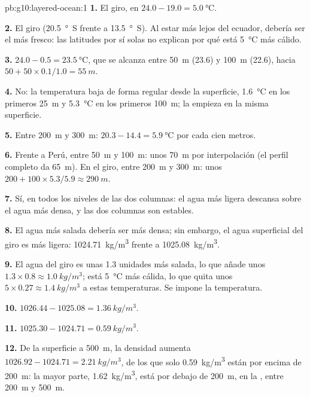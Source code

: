 \begin{solution}{pb:g10:layered-ocean:1}
\textbf{1.} El giro, en $24.0 - 19.0 = \qty{5.0}{\degreeCelsius}$.

\textbf{2.} El giro (\qty{20.5}{\degree S} frente a \qty{13.5}{\degree S}).
Al estar más lejos del ecuador, debería ser el más fresco: las latitudes por
sí solas no explican por qué está \qty{5}{\degreeCelsius} más cálido.

\textbf{3.} $24.0 - 0.5 = \qty{23.5}{\degreeCelsius}$, que se alcanza entre
\qty{50}{m} (23.6) y \qty{100}{m} (22.6), hacia $50 + 50 \times
0.1/1.0 = \qty{55}{m}$.

\textbf{4.} No: la temperatura baja de forma regular desde la superficie,
\qty{1.6}{\degreeCelsius} en los primeros \qty{25}{m} y
\qty{5.3}{\degreeCelsius} en los primeros \qty{100}{m}; la  empieza
en la misma superficie.

\textbf{5.} Entre \qty{200}{m} y \qty{300}{m}: $20.3 - 14.4 =
\qty{5.9}{\degreeCelsius}$ por cada cien metros.

\textbf{6.} Frente a Perú, entre \qty{50}{m} y \qty{100}{m}: unos
\qty{70}{m} por interpolación (el perfil completo da \qty{65}{m}). En el
giro, entre \qty{200}{m} y \qty{300}{m}: unos $200 + 100 \times 5.3/5.9
\approx \qty{290}{m}$.

\textbf{7.} Sí, en todos los niveles de las dos columnas: el agua más ligera
descansa sobre el agua más densa, y las dos columnas son estables.

\textbf{8.} El agua más salada debería ser más densa; sin embargo, el agua
superficial del giro es más ligera: \qty{1024.71}{kg/m^3} frente a
\qty{1025.08}{kg/m^3}.

\textbf{9.} El agua del giro es unas 1.3 unidades más salada, lo que añade
unos $1.3 \times 0.8 \approx \qty{1.0}{kg/m^3}$; está
\qty{5}{\degreeCelsius} más cálida, lo que quita unos $5 \times 0.27 \approx \qty{1.4}{kg/m^3}$ a estas temperaturas. Se impone la temperatura.

\textbf{10.} $1026.44 - 1025.08 = \qty{1.36}{kg/m^3}$.

\textbf{11.} $1025.30 - 1024.71 = \qty{0.59}{kg/m^3}$.

\textbf{12.} De la superficie a \qty{500}{m}, la densidad aumenta
$1026.92 - 1024.71 = \qty{2.21}{kg/m^3}$, de los que solo
\qty{0.59}{kg/m^3} están por encima de \qty{200}{m}: la mayor parte,
\qty{1.62}{kg/m^3}, está por debajo de \qty{200}{m}, en la , entre
\qty{200}{m} y \qty{500}{m}.


\end{solution}
